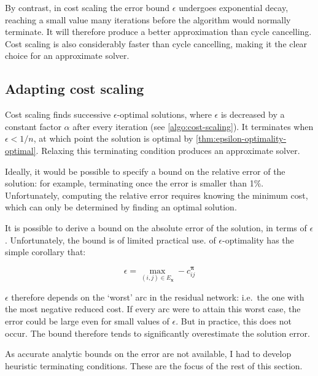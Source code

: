 By contrast, in cost scaling the error bound $\epsilon$ undergoes exponential decay\footnotemark, reaching a small value many iterations before the algorithm would normally terminate. It will therefore produce a better approximation than cycle cancelling. Cost scaling is also considerably faster than cycle cancelling, making it the clear choice for an approximate solver.

\subsection{Adapting cost scaling} \label{sec:impl-approx-adaptions}

Cost scaling finds successive $\epsilon$-optimal solutions, where $\epsilon$ is decreased by a constant factor $\alpha$ after every iteration (see \cref{algo:cost-scaling}). It terminates when $\epsilon < 1/n$, at which point the solution is optimal by \cref{thm:epsilon-optimality-optimal}. Relaxing this terminating condition produces an approximate solver.

Ideally, it would be possible to specify a bound on the relative error of the solution: for example, terminating once the error is smaller than 1\%. Unfortunately, computing the relative error requires knowing the minimum cost, which can only be determined by finding an optimal solution.

It is possible to derive a bound on the absolute error of the solution, in terms of $\epsilon$. Unfortunately, the bound is of limited practical use.  of $\epsilon$-optimality has the simple corollary that:

\[\epsilon = \max_{(i,j) \in E_\mathbf{x}} -c_{ij}^{\boldsymbol{\pi}}\]

$\epsilon$ therefore depends on the `worst' arc in the residual network: i.e.\ the one with the most negative reduced cost. If every arc were to attain this worst case, the error could be large even for small values of $\epsilon$. But in practice, this does not occur. The bound therefore tends to significantly overestimate the solution error.

As accurate analytic bounds on the error are not available, I had to develop heuristic terminating conditions. These are the focus of the rest of this section.

